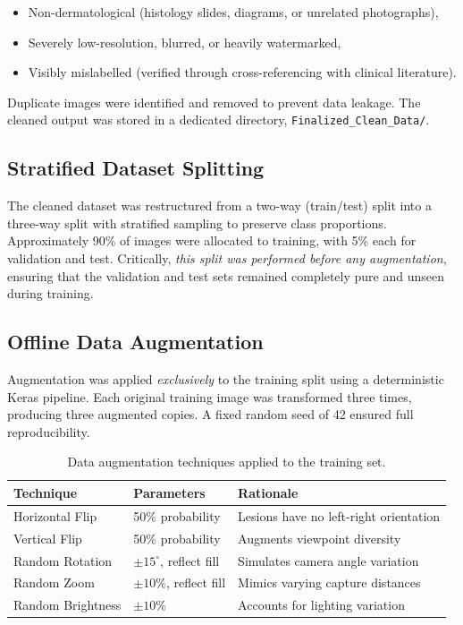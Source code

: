 \begin{itemize}
    \item Non-dermatological (histology slides, diagrams, or unrelated photographs),
    \item Severely low-resolution, blurred, or heavily watermarked,
    \item Visibly mislabelled (verified through cross-referencing with clinical literature).
\end{itemize}

Duplicate images were identified and removed to prevent data leakage. The cleaned output was stored in a dedicated directory, \texttt{Finalized\_Clean\_Data/}.

\subsection{Stratified Dataset Splitting}

The cleaned dataset was restructured from a two-way (train/test) split into a three-way split with stratified sampling to preserve class proportions. Approximately 90\% of images were allocated to training, with 5\% each for validation and test. Critically, \textit{this split was performed before any augmentation}, ensuring that the validation and test sets remained completely pure and unseen during training.

\subsection{Offline Data Augmentation}

Augmentation was applied \textit{exclusively} to the training split using a deterministic Keras pipeline. Each original training image was transformed three times, producing three augmented copies. A fixed random seed of 42 ensured full reproducibility.

\begin{table}[H]
\centering
\caption{Data augmentation techniques applied to the training set.}
\label{tab:augmentation}
\begin{tabular}{|l|l|l|}
\hline
\textbf{Technique} & \textbf{Parameters} & \textbf{Rationale} \\ \hline
Horizontal Flip & 50\% probability & Lesions have no left-right orientation \\ \hline
Vertical Flip & 50\% probability & Augments viewpoint diversity \\ \hline
Random Rotation & $\pm 15^{\circ}$, reflect fill & Simulates camera angle variation \\ \hline
Random Zoom & $\pm 10\%$, reflect fill & Mimics varying capture distances \\ \hline
Random Brightness & $\pm 10\%$ & Accounts for lighting variation \\ \hline
\end{tabular}
\end{table}

